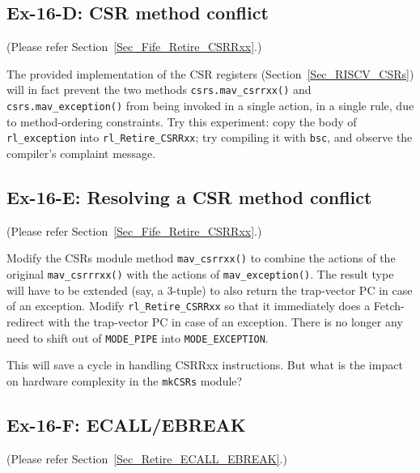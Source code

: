 
\subsection*{Ex-16-D: CSR method conflict}
\label{Ex-16-D-CSR-Method-Conflict}

(Please refer Section~\ref{Sec_Fife_Retire_CSRRxx}.)

The provided implementation of the CSR registers
(Section~\ref{Sec_RISCV_CSRs}) will in fact prevent the two methods
\verb|csrs.mav_csrrxx()| and \verb|csrs.mav_exception()| from being
invoked in a single action, {\ie} in a single rule, due to
method-ordering constraints.  Try this experiment: copy the body of
\verb|rl_exception| into \verb|rl_Retire_CSRRxx|; try compiling it
with \verb|bsc|, and observe the compiler's complaint message.


\subsection*{Ex-16-E: Resolving a CSR method conflict}
\label{Ex-16-E-Resolving-a-CSR-Method-Conflict}

(Please refer Section~\ref{Sec_Fife_Retire_CSRRxx}.)

Modify the CSRs module method \verb|mav_csrrxx()| to combine the
actions of the original \verb|mav_csrrrxx()| with the actions of
\verb|mav_exception()|.  The result type will have to be extended
(say, a 3-tuple) to also return the trap-vector PC in case of an
exception.  Modify \verb|rl_Retire_CSRRxx| so that it immediately does
a Fetch-redirect with the trap-vector PC in case of an exception.
There is no longer any need to shift out of \verb|MODE_PIPE| into
\verb|MODE_EXCEPTION|.

This will save a cycle in handling CSRRxx instructions.  But what is
the impact on hardware complexity in the \verb|mkCSRs| module?


\subsection*{Ex-16-F: ECALL/EBREAK}
\label{Ex-16-F-ECALL-EBREAK}

(Please refer Section~\ref{Sec_Retire_ECALL_EBREAK}.)


